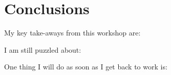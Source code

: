\chapter*{Conclusions}

My key take-aways from this workshop are:


I am still puzzled about:


One thing I will do as soon as I get back to work is:

